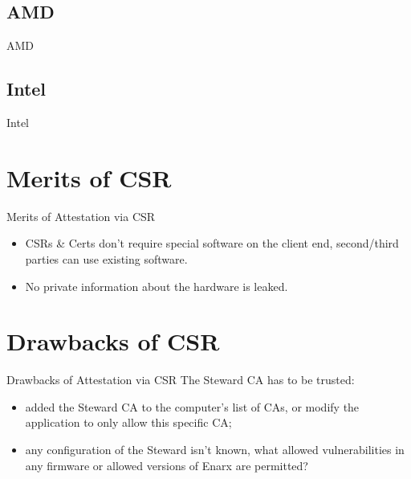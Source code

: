 \documentclass[graphics]{beamer}
\begin{document}
\subsection{AMD}
\begin{frame}{AMD}
\end{frame}

\subsection{Intel}
\begin{frame}{Intel}
\end{frame}

\section{Merits of CSR}
\begin{frame}{Merits of Attestation via CSR}
\begin{itemize}
    \item CSRs \& Certs don't require special software on the client end, second/third parties can use existing software.
    \item No private information about the hardware is leaked.
\end{itemize}
\end{frame}

\section{Drawbacks of CSR}
\begin{frame}{Drawbacks of Attestation via CSR}
The Steward CA has to be trusted:
\begin{itemize}
    \item added the Steward CA to the computer's list of CAs, or modify the application to only allow this specific CA;
    \item any configuration of the Steward isn't known, what allowed vulnerabilities in any firmware or allowed versions of Enarx are permitted?
\end{itemize}
\end{frame}
\end{document}
